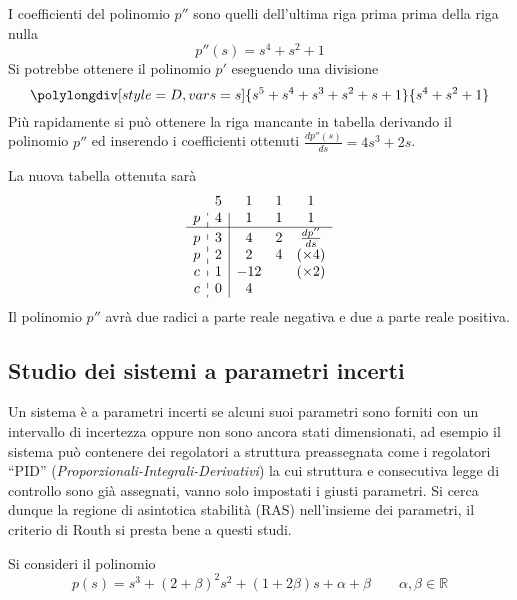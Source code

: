 I coefficienti del polinomio $p''$ sono quelli dell'ultima riga prima prima
della riga nulla
$$
p''(s) = s^4 + s^2 + 1
$$
Si potrebbe ottenere il polinomio $p'$ eseguendo una divisione
$$
\polylongdiv[style=D,vars=s]{s^5+s^4+s^3+s^2+s+1}{s^4+s^2+1}
$$
Più rapidamente si può ottenere la riga mancante in tabella derivando il
polinomio $p''$ ed inserendo i coefficienti ottenuti $\frac{dp''(s)}{ds} = 4s^3
+ 2s$.

La nuova tabella ottenuta sarà
$$
\begin{array}{c:c|ccc}
  & 5 & 1 & 1 & 1 \\
p & 4 & 1 & 1 & 1 \\ \hline
p & 3 & 4 & 2 & \frac{dp''}{ds}\\
p & 2 & 2 & 4 &(\times 4)\\
c & 1 & -12 & & (\times2)\\
c & 0 & 4
\end{array}
$$
Il polinomio $p''$ avrà due radici a parte reale negativa e due a parte
reale positiva.

\newpage
\subsection{Studio dei sistemi a parametri incerti}
Un sistema è a parametri incerti se alcuni suoi parametri sono forniti con un
intervallo di incertezza oppure non sono ancora stati dimensionati, ad esempio
il sistema può contenere dei regolatori a struttura preassegnata come i
regolatori ``PID'' (\textit{Proporzionali-Integrali-Derivativi}) la cui
struttura e consecutiva legge di controllo sono già assegnati, vanno solo
impostati i giusti parametri.
Si cerca dunque la regione di asintotica stabilità (RAS) nell'insieme dei
parametri, il criterio di Routh si presta bene a questi studi.

Si consideri il polinomio
$$
p(s) =s^3 + (2+\beta)^2s^2 + (1+2\beta)s + \alpha + \beta \qquad \alpha,\beta
\in \mathbb{R}
$$

